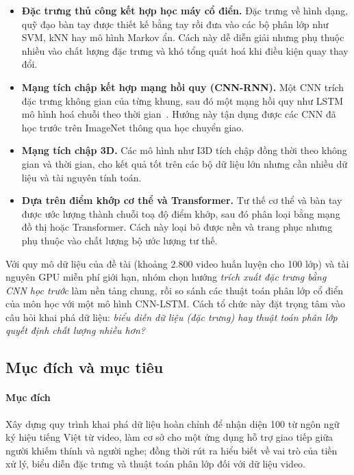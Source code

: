\begin{itemize}
  \item \textbf{Đặc trưng thủ công kết hợp học máy cổ điển.} Đặc trưng về hình dạng, quỹ đạo bàn tay được thiết kế bằng tay rồi đưa vào các bộ phân lớp như SVM, kNN hay mô hình Markov ẩn. Cách này dễ diễn giải nhưng phụ thuộc nhiều vào chất lượng đặc trưng và khó tổng quát hoá khi điều kiện quay thay đổi.
  \item \textbf{Mạng tích chập kết hợp mạng hồi quy (CNN-RNN).} Một CNN trích đặc trưng không gian của từng khung, sau đó một mạng hồi quy như LSTM mô hình hoá chuỗi theo thời gian~\cite{donahue2015lrcn}. Hướng này tận dụng được các CNN đã học trước trên ImageNet thông qua học chuyển giao.
  \item \textbf{Mạng tích chập 3D.} Các mô hình như I3D tích chập đồng thời theo không gian và thời gian, cho kết quả tốt trên các bộ dữ liệu lớn nhưng cần nhiều dữ liệu và tài nguyên tính toán.
  \item \textbf{Dựa trên điểm khớp cơ thể và Transformer.} Tư thế cơ thể và bàn tay được ước lượng thành chuỗi toạ độ điểm khớp, sau đó phân loại bằng mạng đồ thị hoặc Transformer. Cách này loại bỏ được nền và trang phục nhưng phụ thuộc vào chất lượng bộ ước lượng tư thế.
\end{itemize}

Với quy mô dữ liệu của đề tài (khoảng 2.800 video huấn luyện cho 100 lớp) và tài nguyên GPU miễn phí giới hạn, nhóm chọn hướng \emph{trích xuất đặc trưng bằng CNN học trước} làm nền tảng chung, rồi so sánh các thuật toán phân lớp cổ điển của môn học với một mô hình CNN-LSTM. Cách tổ chức này đặt trọng tâm vào câu hỏi khai phá dữ liệu: \emph{biểu diễn dữ liệu (đặc trưng) hay thuật toán phân lớp quyết định chất lượng nhiều hơn?}

\subsection{Mục đích và mục tiêu}
\label{subsec:goals}

\paragraph*{Mục đích} Xây dựng quy trình khai phá dữ liệu hoàn chỉnh để nhận diện 100 từ ngôn ngữ ký hiệu tiếng Việt từ video, làm cơ sở cho một ứng dụng hỗ trợ giao tiếp giữa người khiếm thính và người nghe; đồng thời rút ra hiểu biết về vai trò của tiền xử lý, biểu diễn đặc trưng và thuật toán phân lớp đối với dữ liệu video.

